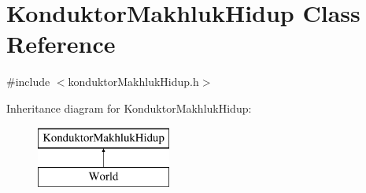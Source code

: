 \hypertarget{class_konduktor_makhluk_hidup}{}\section{Konduktor\+Makhluk\+Hidup Class Reference}
\label{class_konduktor_makhluk_hidup}


{\ttfamily \#include $<$konduktor\+Makhluk\+Hidup.\+h$>$}

Inheritance diagram for Konduktor\+Makhluk\+Hidup\+:\begin{figure}[H]
\begin{center}
\leavevmode
\includegraphics[height=2.000000cm]{class_konduktor_makhluk_hidup}
\end{center}
\end{figure}

